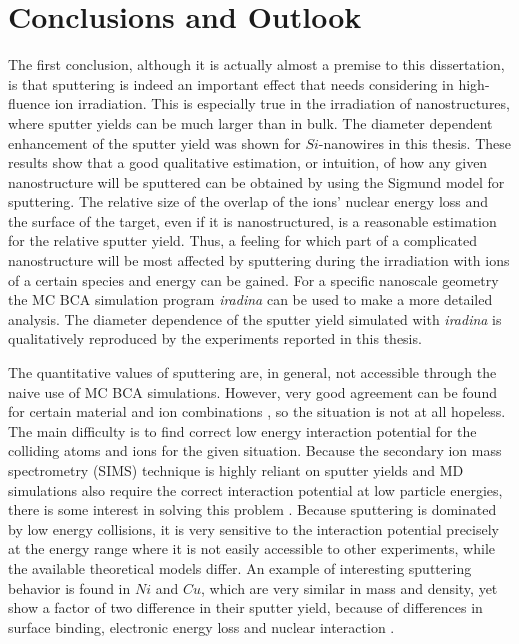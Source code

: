 \chapter{Conclusions and Outlook}

The first conclusion, although it is actually almost a premise to this dissertation, is that sputtering is indeed an important effect that needs considering in high-fluence ion irradiation. This is especially true in the irradiation of nanostructures, where sputter yields can be much larger than in bulk. The diameter dependent enhancement of the sputter yield was shown for $Si$-nanowires in this thesis. These results show that a good qualitative estimation, or intuition, of how any given nanostructure will be sputtered can be obtained by using the Sigmund model for sputtering. The relative size of the overlap of the ions' nuclear energy loss and the surface of the target, even if it is nanostructured, is a reasonable estimation for the relative sputter yield. Thus, a feeling for which part of a complicated nanostructure will be most affected by sputtering during the irradiation with ions of a certain species and energy can be gained. For a specific nanoscale geometry the MC BCA simulation program \emph{iradina} \cite{borschel_ion_2011} can be used to make a more detailed analysis. The diameter dependence of the sputter yield simulated with \emph{iradina} is qualitatively reproduced by the experiments reported in this thesis.

The quantitative values of sputtering are, in general, not accessible through the naive use of MC BCA simulations. However, very good agreement can be found for certain material and ion combinations \cite{biersack_computer_1987,hofsass_simulation_2014}, so the situation is not at all hopeless. The main difficulty is to find correct low energy interaction potential for the colliding atoms and ions for the given situation. Because the secondary ion mass spectrometry (SIMS) technique is highly reliant on sputter yields and MD simulations also require the correct interaction potential at low particle energies, there is some interest in solving this problem \cite{nordlund_interatomic_2008}. Because sputtering is dominated by low energy collisions, it is very sensitive to the interaction potential precisely at the energy range where it is not easily accessible to other experiments, while the available theoretical models differ. An example of interesting sputtering behavior is found in $Ni$ and $Cu$, which are very similar in mass and density, yet show a factor of two difference in their sputter yield, because of differences in surface binding, electronic energy loss and nuclear interaction \cite{biersack_computer_1987}. 

